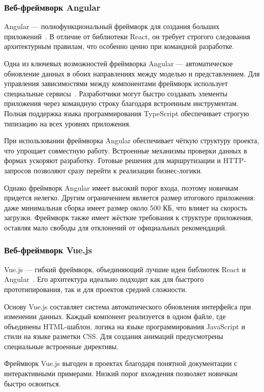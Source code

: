 \subsubsection{Веб-фреймворк Angular}
Angular --- полнофункциональный фреймворк для создания больших приложений~\cite{angular_overview}. В отличие от библиотеки React, он требует строгого следования архитектурным правилам, что особенно ценно при командной разработке.

Одна из ключевых возможностей фреймворка Angular --- автоматическое обновление данных в обоих направлениях между моделью и представлением. Для управления зависимостями между компонентами фреймворк использует специальные сервисы~\cite{angular_dependency_injection}. Разработчики могут быстро создавать элементы приложения через командную строку благодаря встроенным инструментам. Полная поддержка языка программирования TypeScript обеспечивает строгую типизацию на всех уровнях приложения.

При использовании фреймворка Angular обеспечивает чёткую структуру проекта, что упрощает совместную работу. Встроенные механизмы проверки данных в формах ускоряют разработку. Готовые решения для маршрутизации и HTTP-запросов позволяют сразу перейти к реализации бизнес-логики.

Однако фреймворк Angular имеет высокий порог входа, поэтому новичкам придется нелегко. Другим ограничением является размер итогового приложения: даже минимальная сборка имеет размер около 500 КБ, что влияет на скорость загрузки. Фреймворк также имеет жёсткие требования к структуре приложения, оставляя мало свободы для отклонений от официальных рекомендаций.

\subsubsection{Веб-фреймворк Vue.js}
Vue.js --- гибкий фреймворк, объединяющий лучшие идеи библиотек React и Angular~\cite{vuejs_guide}. Его архитектура идеально подходит как для быстрого прототипирования, так и для проектов средней сложности.

Основу Vue.js составляет система автоматического обновления интерфейса при изменении данных. Каждый компонент реализуется в одном файле, где объединены HTML-шаблон, логика на языке программирования JavaScript и стили на языке разметки CSS. Для создания анимаций предусмотрены специальные встроенные директивы.

Фреймворк Vue.js выгоден в проектах благодаря понятной документации с интерактивными примерами. Низкий порог вхождения позволяет новичкам быстро освоиться.

